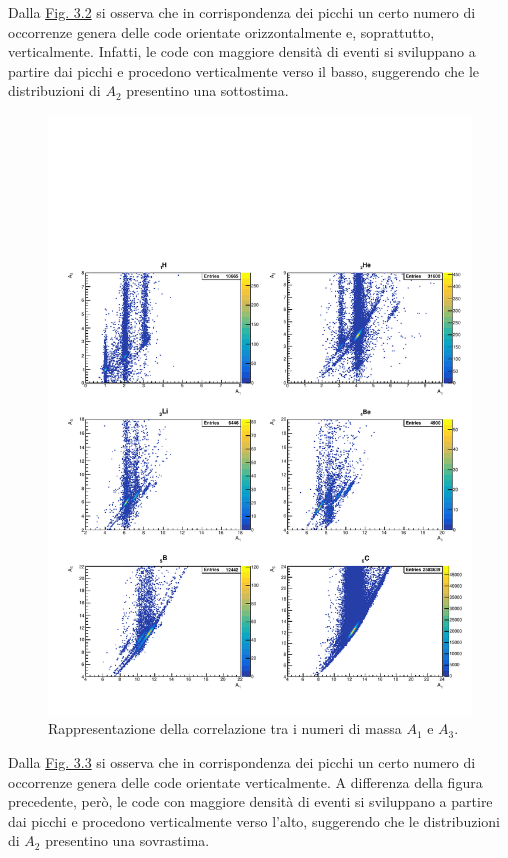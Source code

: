 \documentclass[12pt,a4paper,twoside]{report}
\begin{document}
	Dalla \hyperref[fig:a1]{Fig. 3.2} si osserva che in corrispondenza dei picchi un certo numero di occorrenze genera delle code orientate orizzontalmente e, soprattutto, verticalmente. Infatti, le code con maggiore densità di eventi si sviluppano a partire dai picchi e procedono verticalmente verso il basso, suggerendo che le distribuzioni di $A_2$ presentino una sottostima.
	\begin{figure}[H]
		\centering
		\includegraphics[width=1.\linewidth]{c_MultiCanvas2.pdf}
		\caption{Rappresentazione della correlazione tra i numeri di massa $A_1$ e $A_3$.}
		\label{fig:a2}
	\end{figure}
	Dalla \hyperref[fig:a2]{Fig. 3.3} si osserva che in corrispondenza dei picchi un certo numero di occorrenze genera delle code orientate verticalmente. A differenza della figura precedente, però, le code con maggiore densità di eventi si sviluppano a partire dai picchi e procedono verticalmente verso l'alto, suggerendo che le distribuzioni di $A_2$ presentino una sovrastima.
\end{document}
